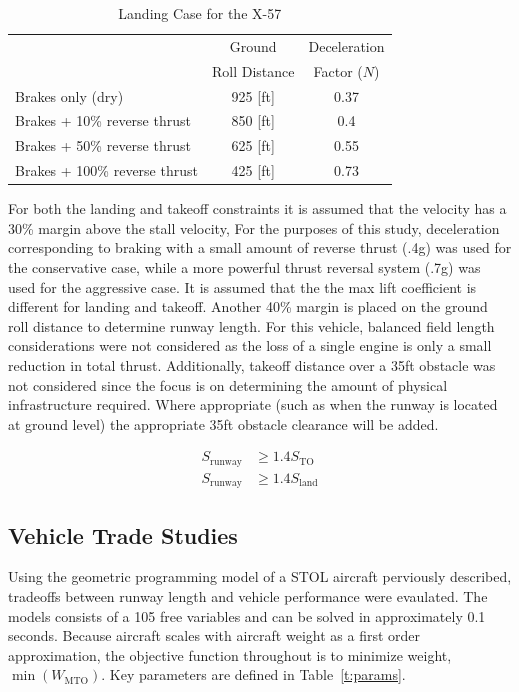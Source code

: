 \documentclass[]{aiaa-tc}%
\begin{document}
\begin{table}[H]
    \centering
    \caption{Landing Case for the X-57}
    \label{t:landingdecel}
    \begin{tabular}{lcc}
    \toprule
    \toprule
                                    & Ground          & Deceleration \\ 
                                    & Roll Distance   & Factor ($N$)\\ \hline
    Brakes only (dry)               &  925 [ft]       & 0.37  \\
    Brakes + 10\% reverse thrust    &  850 [ft]       & 0.4   \\
    Brakes + 50\% reverse thrust    &  625 [ft]       & 0.55  \\
    Brakes + 100\% reverse thrust   &  425 [ft]       & 0.73  \\
    \bottomrule
\end{tabular}
\end{table}

For both the landing and takeoff constraints it is assumed that the velocity has a 30\% margin above the stall velocity,
For the purposes of this study, deceleration corresponding to braking with a small amount of reverse thrust (.4g) was used for the conservative case, while a more powerful thrust reversal system (.7g) was used for the aggressive case. 
It is assumed that the the max lift coefficient is different for landing and takeoff.
Another 40\% margin is placed on the ground roll distance to determine runway length.  For this vehicle, balanced field length considerations were not considered as the loss of a single engine is only a small reduction in total thrust.  Additionally, takeoff distance over a 35ft obstacle was not considered since the focus is on determining the amount of physical infrastructure required.  Where appropriate (such as when the runway is located at ground level) the appropriate 35ft obstacle clearance will be added.  

\begin{align}
    S_{\mathrm{runway}} &\geq 1.4S_{\mathrm{TO}} \\
    S_{\mathrm{runway}} &\geq 1.4S_{\mathrm{land}} 
\end{align}

\subsection{Vehicle Trade Studies}

Using the geometric programming model of a STOL aircraft perviously described, tradeoffs between runway length and vehicle performance were evaulated.  The models consists of a 105 free variables and can be solved in approximately 0.1 seconds. 
Because aircraft scales with aircraft weight as a first order approximation, the objective function throughout is to minimize weight, $\min{(W_{\mathrm{MTO}})}$. 
Key parameters are defined in Table~\ref{t:params}.
\end{document}

